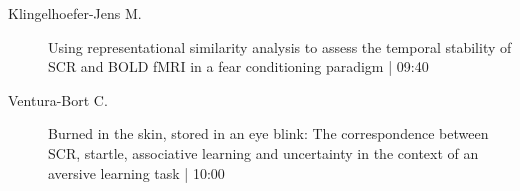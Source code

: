 \begin{symposium}
\begin{description}
                \item [ Klingelhoefer-Jens M.] Using representational similarity analysis to assess the temporal stability of SCR and BOLD fMRI in a fear conditioning paradigm \textcolor{mygray}{ | 09:40}    
                
                \item [ Ventura-Bort C.] Burned in the skin, stored in an eye blink: The correspondence between SCR, startle, associative learning and uncertainty in the context of an aversive learning task \textcolor{mygray}{ | 10:00}    
                
            \end{description} 
            \end{symposium}
            